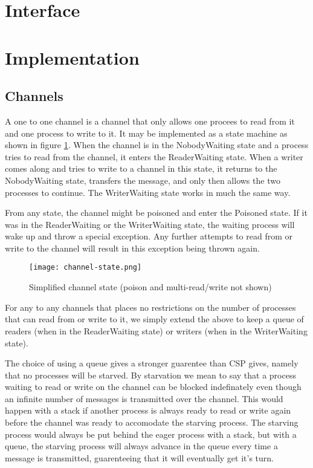 \documentclass[11pt,oneside,a4paper]{article}
\begin{document}
\section{Interface}


\section{Implementation}

\subsection{Channels}
A one to one channel is a channel that only allows one procees to read from it and one process 
to write to it. It may be implemented as a state machine as shown in figure \ref{channel-state}.
When the channel is in the NobodyWaiting state and a process tries to read from the channel,
it enters the ReaderWaiting state. When a writer comes along and tries to write to a channel
in this state, it returns to the NobodyWaiting state, transfers the message, and only then
allows the two processes to continue. The WriterWaiting state works in much the same way.

From any state, the channel might be poisoned and enter the Poisoned state. If it was in the
ReaderWaiting or the WriterWaiting state, the waiting process will wake up and throw a special
exception. Any further attempts to read from or write to the channel will result in this 
exception being thrown again.

\begin{figure}[h]
\centering
\texttt{[image: channel-state.png]}
\caption{Simplified channel state (poison and multi-read/write not shown)}
\label{channel-state}
\end{figure}

For any to any channels that places no restrictions on the number of processes that can read
from or write to it, we simply extend the above to keep a queue of readers (when in the 
ReaderWaiting state) or writers (when in the WriterWaiting state).

The choice of using a queue gives a stronger guarentee than CSP gives, namely that no processes
will be starved. By starvation we mean to say that a process waiting to read or write on the
channel can be blocked indefinately even though an infinite number of messages is transmitted
over the channel. This would happen with a stack if another process is always ready to read or 
write again before the channel was ready to accomodate the starving process. The starving process
would always be put behind the eager process with a stack, but with a queue, the starving process
will always advance in the queue every time a message is transmitted, guarenteeing that it will
eventually get it's turn.
\end{document}
